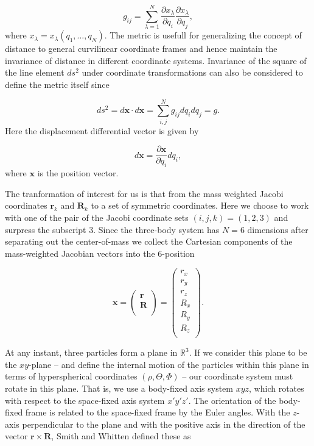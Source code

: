 \documentclass{article}
\numberwithin{equation}{section}
\numberwithin{figure}{section}
\begin{document}
\begin{equation}
g_{ij} = \sum_{\lambda = 1}^{N} \frac{\partial x_{\lambda}}{\partial q_{i}} \frac{\partial x_{\lambda}}{\partial q_{j}},
\end{equation}
where $x_{\lambda} = x_{\lambda}(q_1,\ldots,q_N)$. The metric is usefull for generalizing the concept of distance to general curvilinear coordinate frames and hence maintain the invariance of distance in different coordinate systems. Invariance of the square of the line element $ds^2$ under coordinate transformations can also be considered to define the metric itself since

\begin{equation}
ds^2 = d\mathbf{x} \cdot d\mathbf{x} = \sum_{i,j}^{N} g_{ij} dq_{i} dq_{j} = g.
\end{equation}
Here the displacement differential vector is given by

\begin{equation}
d\mathbf{x} = \frac{\partial \mathbf{x}}{\partial q_{i}} dq_{i},
\end{equation} 
where $\mathbf{x}$ is the position vector.

The tranformation of interest for us is that from the mass weighted Jacobi coordinates $\mathbf{r}_k$ and $\mathbf{R}_k$ to a set of symmetric coordinates. Here we choose to work with one of the pair of the Jacobi coordinate sets $(i,j,k)=(1,2,3)$ and surpress the subscript $3$. Since the three-body system has $N=6$ dimensions after separating out the center-of-mass we collect the Cartesian components of the mass-weighted Jacobian vectors into the $6$-position

\begin{equation}
\mathbf{x} = 
\begin{pmatrix} 
\mathbf{r} \\
\mathbf{R} \\
\end{pmatrix} = 
\begin{pmatrix}
r_x \\
r_y \\
r_z \\
R_x \\
R_y \\
R_z\\
\end{pmatrix}.
\end{equation}

At any instant, three particles form a plane in $\mathbb{R}^3$. If we consider this plane to be the $xy$-plane -- and define the internal motion of the particles within this plane in terms of hyperspherical coordinates $(\rho, \Theta, \Phi)$ -- our coordinate system must rotate in this plane. That is, we use a body-fixed axis system $xyz$, which rotates with respect to the space-fixed axis system $x'y'z'$. The orientation of the body-fixed frame is related to the space-fixed frame by the Euler angles. With the $z$-axis perpendicular to the plane and with the positive axis in the direction of the vector $\mathbf{r} \times \mathbf{R}$, Smith and Whitten \cite{Smith_Whitten1968} defined these as   
\end{document}
